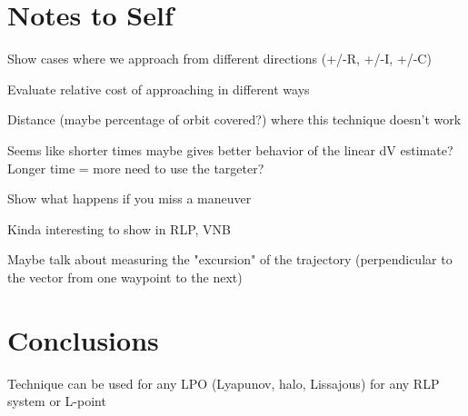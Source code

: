 \documentclass[a4paper]{article}
\begin{document}
\section{Notes to Self}

Show cases where we approach from different directions (+/-R, +/-I, +/-C)

Evaluate relative cost of approaching in different ways

Distance (maybe percentage of orbit covered?) where this technique doesn't work

Seems like shorter times maybe gives better behavior of the linear dV estimate?  Longer time = more need to use the targeter?

Show what happens if you miss a maneuver

Kinda interesting to show in RLP, VNB

Maybe talk about measuring the "excursion" of the trajectory (perpendicular to the vector from one waypoint to the next)

\section{Conclusions}

Technique can be used for any LPO (Lyapunov, halo, Lissajous) for any RLP system or L-point



\end{document}
